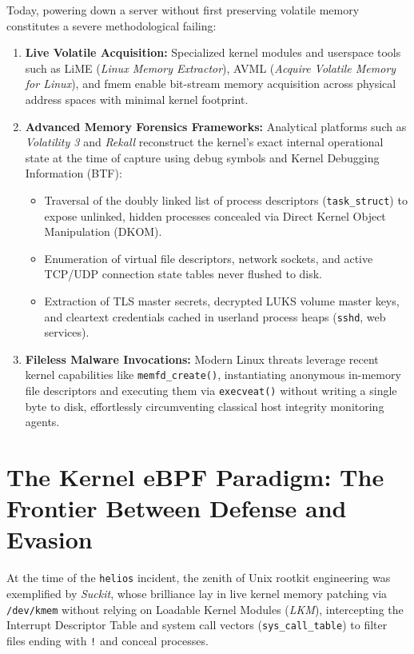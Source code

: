 Today, powering down a server without first preserving volatile memory constitutes a severe methodological failing:
\begin{enumerate}
    \item \textbf{Live Volatile Acquisition:} Specialized kernel modules and userspace tools such as LiME (\textit{Linux Memory Extractor}), AVML (\textit{Acquire Volatile Memory for Linux}), and fmem enable bit-stream memory acquisition across physical address spaces with minimal kernel footprint.
    \item \textbf{Advanced Memory Forensics Frameworks:} Analytical platforms such as \textit{Volatility 3} and \textit{Rekall} reconstruct the kernel's exact internal operational state at the time of capture using debug symbols and Kernel Debugging Information (BTF):
    \begin{itemize}
        \item Traversal of the doubly linked list of process descriptors (\texttt{task\_struct}) to expose unlinked, hidden processes concealed via Direct Kernel Object Manipulation (DKOM).
        \item Enumeration of virtual file descriptors, network sockets, and active TCP/UDP connection state tables never flushed to disk.
        \item Extraction of TLS master secrets, decrypted LUKS volume master keys, and cleartext credentials cached in userland process heaps (\texttt{sshd}, web services).
    \end{itemize}
    \item \textbf{Fileless Malware Invocations:} Modern Linux threats leverage recent kernel capabilities like \texttt{memfd\_create()}, instantiating anonymous in-memory file descriptors and executing them via \texttt{execveat()} without writing a single byte to disk, effortlessly circumventing classical host integrity monitoring agents.
\end{enumerate}

\section{The Kernel eBPF Paradigm: The Frontier Between Defense and Evasion}

At the time of the \texttt{helios} incident, the zenith of Unix rootkit engineering was exemplified by \textit{Suckit}, whose brilliance lay in live kernel memory patching via \texttt{/dev/kmem} without relying on Loadable Kernel Modules (\textit{LKM}), intercepting the Interrupt Descriptor Table and system call vectors (\texttt{sys\_call\_table}) to filter files ending with \texttt{!} and conceal processes.


